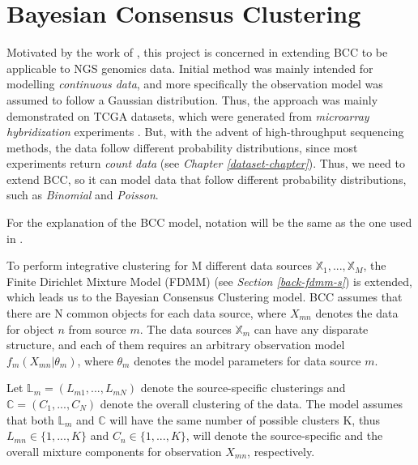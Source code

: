 \section{Bayesian Consensus Clustering} \label{integr-bcc-sect}
Motivated by the work of \citet{Lock2013}, this project is concerned in extending BCC to be applicable to NGS genomics data. Initial method was mainly intended for modelling \emph{continuous data}, and more specifically the observation model was assumed to follow a Gaussian distribution. Thus, the approach was mainly demonstrated on TCGA datasets, which were generated from \emph{microarray hybridization} experiments \citep{Babu2004}. But, with the advent of high-throughput sequencing methods, the data follow different probability distributions, since most experiments return \emph{count data} (see \emph{Chapter \ref{dataset-chapter}}). Thus, we need to extend BCC, so it can model data that follow different probability distributions, such as \emph{Binomial} and \emph{Poisson}.

For the explanation of the BCC model, notation will be the same as the one used in \citet{Lock2013}. 

To perform integrative clustering for M different data sources $\mathbb{X}_{1},..., \mathbb{X}_{M}$, the Finite Dirichlet Mixture Model (FDMM) (see \emph{Section \ref{back-fdmm-s}}) is extended, which leads us to the Bayesian Consensus Clustering model. BCC assumes that there are N common objects for each data source, where $X_{mn}$ denotes the data for object $n$ from source $m$. The data sources $\mathbb{X}_{m}$ can have any disparate structure, and each of them requires an arbitrary observation model $f_{m}(X_{mn}|\theta_{m})$, where $\theta_{m}$ denotes the model parameters for data source $m$.

Let $\mathbb{L}_{m} = (L_{m1},...,L_{mN})$ denote the source-specific clusterings and $\mathbb{C} = (C_{1},...,C_{N})$ denote the overall clustering of the data. The model assumes that both $\mathbb{L}_{m}$ and $\mathbb{C}$ will have the same number of possible clusters K, thus $L_{mn} \in \lbrace 1,...,K \rbrace$ and $C_{n} \in \lbrace 1,...,K \rbrace$, will denote the source-specific and the overall mixture components for observation $X_{mn}$, respectively.

